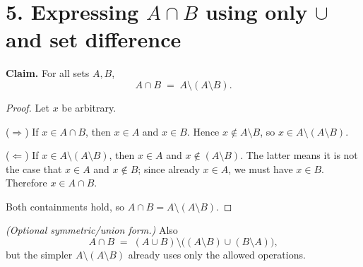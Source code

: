 \section*{5. Expressing $A\cap B$ using only $\cup$ and set difference}

\noindent\textbf{Claim.} For all sets $A,B$,
\[
A\cap B \;=\; A\setminus(A\setminus B).
\]

\begin{proof}
Let $x$ be arbitrary.

($\Rightarrow$) If $x\in A\cap B$, then $x\in A$ and $x\in B$. Hence $x\notin A\setminus B$,
so $x\in A\setminus(A\setminus B)$.

($\Leftarrow$) If $x\in A\setminus(A\setminus B)$, then $x\in A$ and $x\notin(A\setminus B)$.
The latter means it is not the case that $x\in A$ and $x\notin B$; since already $x\in A$,
we must have $x\in B$. Therefore $x\in A\cap B$.

Both containments hold, so $A\cap B=A\setminus(A\setminus B)$.
\end{proof}

\noindent\emph{(Optional symmetric/union form.)} Also
\[
A\cap B \;=\; (A\cup B)\setminus\bigl((A\setminus B)\cup(B\setminus A)\bigr),
\]
but the simpler $A\setminus(A\setminus B)$ already uses only the allowed operations.
